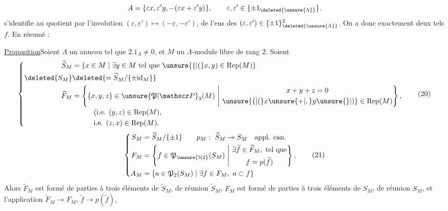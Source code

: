\[
A=\{\varepsilon x,\varepsilon'y,-(\varepsilon x+\varepsilon'y)\},\qquad \varepsilon,\varepsilon'\in\{\pm1_{\deleted{\unsure{\Lambda}}}\}.
\]
  s'identifie au quotient par l'involution $(\varepsilon,\varepsilon')\mapsto(-\varepsilon,-\varepsilon')$, de l'ens des $(\varepsilon,\varepsilon')\in\{\pm1\}_{\deleted{\unsure{\Lambda}}}^2$. On a donc exactement deux tels $f$. En résumé :

\uline{Proposition}\quad Soient $\Lambda$ un anneau tel que $2.1_\Lambda\ne0$, et $M$ un $\Lambda$-module libre de rang $2$. Soient  
\[
\left\{\begin{aligned}
\widetilde S_M&=\{x\in M\mid\exists y\in M\ \text{tel que }\unsure{\{|(}x,y)\in\mathrm{Rep}(M)\}\\
\deleted{S_M}&\deleted{=\widetilde S_M/\{\pm\mathrm{id}_M\}}\\
\widetilde F_M&=\left\{\{x,y,z\}\in\unsure{\mathfrak P|\mathscr P}_3(M)\ \middle|\
\begin{gathered}x+y+z=0\\\unsure{\{|(}x\unsure{+|,}y\unsure{\}|)}\in\mathrm{Rep}(M)\end{gathered}\right\},\\[-2pt]
&\hspace{3em}\text{(i.e. }(y,z)\in\mathrm{Rep}(M),\\
&\hspace{3em}\text{i.e. }(z,x)\in\mathrm{Rep}(M).
\end{aligned}\right.\tag*{(20)}
\]
\[
\left\{\begin{aligned}
S_M&=\widetilde S_M/\{\pm1\}\qquad p_M:\ \widetilde S_M\to S_M\quad\text{appl. can.}\\
F_M&=\left\{f\in\mathfrak P_{\unsure{3|2}}(S_M)\ \middle|\
\begin{gathered}\exists\widetilde f\in\widetilde F_M,\ \text{tel que}\\ f=p(\widetilde f)\end{gathered}\right\},\\
A_M&=\{a\in\mathfrak P_2(S_M)\mid\exists f\in F_M,\ a\subset f\}
\end{aligned}\right.\tag*{(21)}
\]
Alors $\widetilde F_M$ est formé de parties à trois éléments de $\widetilde S_M$, de réunion $\widetilde S_M$, $F_M$ est formé de parties à trois éléments de $S_M$, de réunion $S_M$, et l'application  $\widetilde F_M\to F_M$, $\widetilde f\to p(\widetilde f)$,
